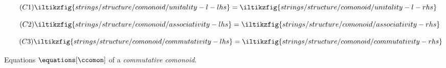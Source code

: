 \begin{figure}
    \centering
    \begin{minipage}{0.21\textwidth}
        \begin{equation}
            \tag{\(\mathsf{C1}\)}
            \iltikzfig{strings/structure/comonoid/unitality-l-lhs}
            =
            \iltikzfig{strings/structure/comonoid/unitality-l-rhs}
            \label{eq:comonoid-unitality-l}
        \end{equation}
    \end{minipage}
    \begin{minipage}{0.26\textwidth}
        \begin{equation}
            \tag{\(\mathsf{C2}\)}
            \iltikzfig{strings/structure/comonoid/associativity-lhs}
            =
            \iltikzfig{strings/structure/comonoid/associativity-rhs}
            \label{eq:comonoid-associativity}
        \end{equation}
    \end{minipage}
    \begin{minipage}{0.26\textwidth}
        \begin{equation}
            \tag{\(\mathsf{C3}\)}
            \iltikzfig{strings/structure/comonoid/commutativity-lhs}
            =
            \iltikzfig{strings/structure/comonoid/commutativity-rhs}
            \label{eq:comonoid-commutativity}
        \end{equation}
    \end{minipage}
    \caption{Equations \(\equations[\ccomon]\) of a \emph{commutative comonoid}.}
    \label{fig:comonoid-equations}
\end{figure}